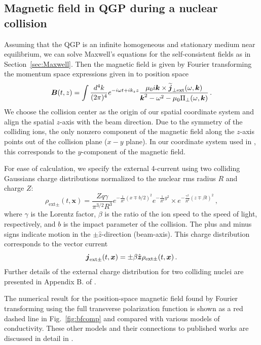 \subsection{Magnetic field in QGP during a nuclear collision}\label{sec:Maxwell2}
Assuming that the QGP is an infinite homogeneous and stationary medium near equilibrium, we can solve Maxwell's equations for the self-consistent fields as in Section~\ref{sec:Maxwell}. Then the magnetic field is given by Fourier transforming the momentum space expressions given in  to position space
\begin{equation}\label{eq:magorgin}
   \boldsymbol{B}(t, z) = \int \frac{d^4k}{(2\pi)^4}  e^{-i\omega t+ik_z z}
 \frac{\mu_0 i \boldsymbol{k} \times\widetilde{\boldsymbol{j}}_{\perp \text{ext}}(\omega, \boldsymbol{k})}{\boldsymbol{k}^2 - \omega^2 - \mu_0 \Pi_{\perp}(\omega, \boldsymbol{k})}\,.
\end{equation}
We choose the collision center as the origin of our spatial coordinate system and align the spatial $z$-axis with the beam direction. Due to the symmetry of the colliding ions, the only nonzero component of the magnetic field along the $z$-axis points out of the collision plane ($x-y$ plane). In our coordinate system used in \cite{Grayson:2022asf}, this corresponds to the $y$-component of the magnetic field. 

For ease of calculation, we specify the external 4-current using two colliding Gaussians charge distributions normalized to the nuclear rms radius $R$ and charge $Z$:
\begin{equation}\label{eq:rhoext}
\rho_{\text{ext}\pm }(t,\boldsymbol{x}) = \frac{Zq\gamma}{\pi^{3/2}R^3}e^{-\frac{1}{R^2}(x\mp b/2)^2}e^{-\frac{1}{R^2}y^2}
\times e^{-\frac{\gamma^2}{R^2}(z\mp \beta t)^2}\,,
\end{equation}
where $\gamma$ is the Lorentz factor, $\beta$ is the ratio of the ion speed to the speed of light, respectively, and $b$ is the impact parameter of the collision. The plus and minus signs indicate motion in the $\pm \hat{z}$-direction (beam-axis). This charge distribution corresponds to the vector current
\begin{equation}\label{eq:jext}
\boldsymbol{j}_{\text{ext}\pm}(t, \boldsymbol{x}) = \pm \beta \hat{\boldsymbol{z}} \rho_{\text{ext}\pm}(t, \boldsymbol{x})\,.
\end{equation}
Further details of the external charge distribution for two colliding nuclei are presented in Appendix B. of \cite{Grayson:2022asf}.

The numerical result for the position-space magnetic field found by Fourier transforming  using the full transverse polarization function  is shown as a red dashed line in Fig.~\ref{fig:bfcomp} and compared with various models of conductivity. These other models and their connections to published works are discussed in detail in \cite{Grayson:2022asf}.

